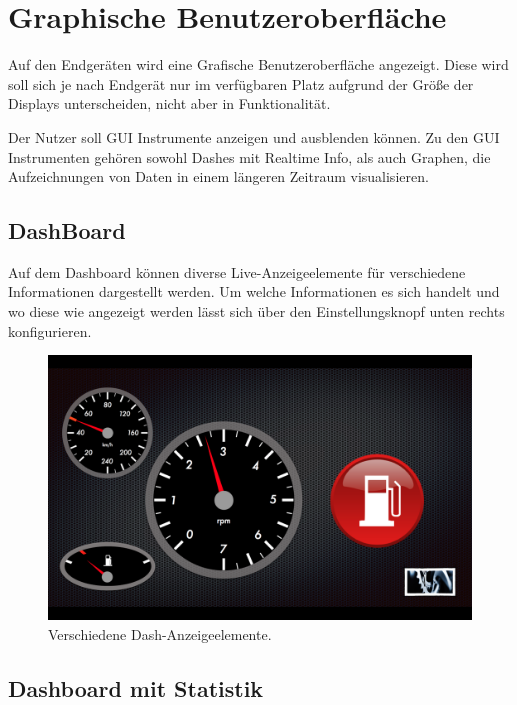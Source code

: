 \documentclass[pflichtenheft.tex]{subfiles}
\begin{document}
\chapter{Graphische Benutzeroberfläche}
Auf den Endgeräten wird eine Grafische Benutzeroberfläche angezeigt. Diese wird soll sich je nach Endgerät nur im verfügbaren Platz aufgrund der Größe der Displays unterscheiden, nicht aber in Funktionalität.

Der Nutzer soll GUI Instrumente anzeigen und ausblenden können. Zu den GUI Instrumenten gehören sowohl Dashes mit Realtime Info, als auch Graphen, die Aufzeichnungen von Daten in einem längeren Zeitraum visualisieren.


\section{DashBoard}

Auf dem Dashboard können diverse Live-Anzeigeelemente für verschiedene Informationen dargestellt werden. Um welche Informationen es sich handelt und wo diese wie angezeigt werden lässt sich über den Einstellungsknopf unten rechts konfigurieren.

\begin{figure}[H]
  	\begin{center}
 		\includegraphics[width=\textwidth]{Images/GUI-Dash.png}
  		\caption{Verschiedene Dash-Anzeigeelemente.}
  	\end{center}
\end{figure}


\section{Dashboard mit Statistik}
\end{document}
